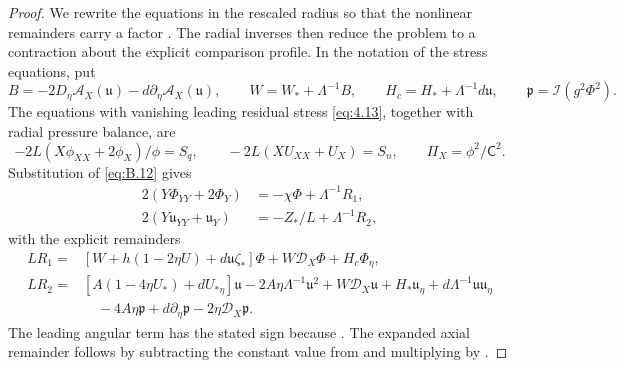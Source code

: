 \begin{proof}
We rewrite the equations in the rescaled radius so that the nonlinear remainders carry a factor
. The radial inverses then reduce the problem to a contraction
about the explicit comparison profile. In the notation of the stress equations, put
\begin{equation}
  B=-2D_\eta\mathcal A_X(\mathfrak u)-d\partial_\eta\mathcal A_X(\mathfrak u),
  \qquad W=W_*+\Lambda^{-1}B,
  \qquad H_c=H_*+\Lambda^{-1}d\mathfrak u,
  \qquad \mathfrak p=\mathcal I(g^2\Phi^2).
  \tag{B.14}\label{eq:B.14}
\end{equation}
The equations with vanishing leading residual stress \eqref{eq:4.13}, together with radial pressure
balance, are
\begin{equation}
  -2L(X\phi_{XX}+2\phi_X)/\phi=S_q,
  \qquad -2L(XU_{XX}+U_X)=S_n,
  \qquad \Pi_X=\phi^2/\mathsf C^2.
  \tag{B.15}\label{eq:B.15}
\end{equation}
Substitution of \eqref{eq:B.12} gives
\begin{align*}
  2(Y\Phi_{YY}+2\Phi_Y)&=-\chi\Phi+\Lambda^{-1}R_1,\\
  2(Y\mathfrak u_{YY}+\mathfrak u_Y)&=-Z_*/L+\Lambda^{-1}R_2,
\end{align*}
with the explicit remainders
\begin{align*}
  LR_1={}&[W+h(1-2\eta U)+d\mathfrak u\zeta_*]\Phi+W\mathcal D_X\Phi+H_c\Phi_\eta,\\
  LR_2={}&[A(1-4\eta U_*)+dU_{*\eta}]\mathfrak u-2A\eta\Lambda^{-1}\mathfrak u^2
            +W\mathcal D_X\mathfrak u+H_*\mathfrak u_\eta+d\Lambda^{-1}\mathfrak u\mathfrak u_\eta\\
          &\quad-4A\eta\mathfrak p+d\partial_\eta\mathfrak p-2\eta\mathcal D_X\mathfrak p.
\end{align*}
The leading angular term has the stated sign because
. The expanded axial remainder follows by
subtracting the constant value  from
and multiplying by .


\end{proof}
